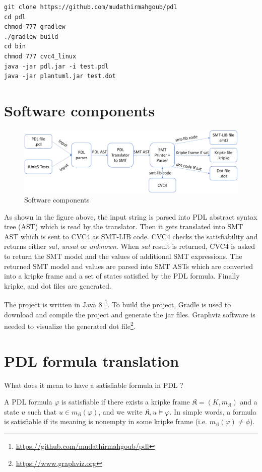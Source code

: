 \documentclass[12pt,a4paper]{article}
\begin{document}
\begin{verbatim}
git clone https://github.com/mudathirmahgoub/pdl
cd pdl
chmod 777 gradlew
./gradlew build
cd bin
chmod 777 cvc4_linux
java -jar pdl.jar -i test.pdl 
java -jar plantuml.jar test.dot
\end{verbatim}



\section{Software components}
\begin{figure}[H]
\center
\includegraphics[scale=0.35]{solver.png}
\caption{Software components}
\end{figure}

As shown in the figure above, the input string is parsed into PDL abstract syntax tree (AST) which is read by the translator. Then it gets translated into SMT AST which is sent to CVC4 as SMT-LIB code. CVC4 checks the satisfiability and returns either \textit{sat}, \textit{unsat} or \textit{unknown}. When \textit{sat} result is returned, CVC4 is asked to return the SMT model and the values of additional SMT expressions. The returned SMT model and values are parsed into SMT ASTs which are converted into a kripke frame and a set of states satisfied by the PDL formula. Finally kripke, and dot files are generated. 

The project is written in Java 8 \footnote{\url{https://github.com/mudathirmahgoub/pdl}}. To build the project, Gradle is used to download and compile the project and generate the jar files. Graphviz software is needed to visualize the generated dot file\footnote{\url{https://www.graphviz.org}}. 

\section{PDL formula translation}

What does it mean to have a satisfiable formula in PDL ?

A PDL formula $\varphi$ is satisfiable if there exists a kripke frame $\mathfrak{K}=(K, m_{\mathfrak{K}})$ and a state  $u$ such that $u \in m_{\mathfrak{K}}(\varphi) $, and we write $\mathfrak{K}, u \models \varphi$. In simple words, a formula is satisfiable if its meaning is nonempty in some kripke frame (i.e. $m_{\mathfrak{K}}(\varphi) \neq \phi$). 
\end{document}
